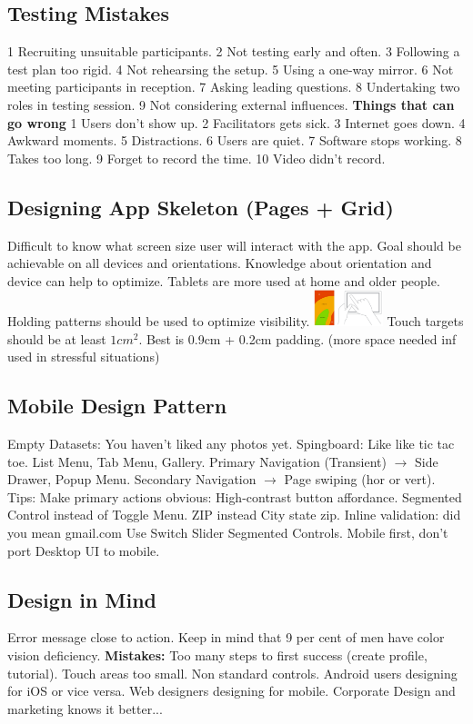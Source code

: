 \subsection{Testing Mistakes}
1 Recruiting unsuitable participants. 2 Not testing early and often. 3 Following a test plan too rigid. 4 Not rehearsing the setup. 5 Using a one-way mirror. 6 Not meeting participants in reception. 7 Asking leading questions. 8 Undertaking two roles in testing session. 9 Not considering external influences.
\textbf{Things that can go wrong}
1 Users don't show up. 2 Facilitators gets sick. 3 Internet goes down. 4 Awkward moments. 5 Distractions. 6 Users are quiet. 7 Software stops working. 8 Takes too long. 9 Forget to record the time. 10 Video didn't record.

\subsection{Designing App Skeleton (Pages + Grid)}
Difficult to know what screen size user will interact with the app. Goal should be achievable on all devices and orientations. Knowledge about orientation and device can help to optimize. Tablets are more used at home and older people. Holding patterns should be used to optimize visibility.
\includegraphics[width=0.15\textwidth]{holding.png}
Touch targets should be at least $1cm^2$. Best is 0.9cm + 0.2cm padding. (more space needed inf used in stressful situations)

\subsection{Mobile Design Pattern}
Empty Datasets: You haven't liked any photos yet.
Spingboard: Like like tic tac toe.
List Menu, Tab Menu, Gallery.
Primary Navigation (Transient) $\rightarrow$ Side Drawer, Popup Menu.
Secondary Navigation $\rightarrow$ Page swiping (hor or vert).
Tips:
Make primary actions obvious: High-contrast button affordance.
Segmented Control instead of Toggle Menu.
ZIP instead City state zip.
Inline validation: did you mean gmail.com
Use Switch Slider Segmented Controls.
Mobile first, don't port Desktop UI to mobile.

\subsection{Design in Mind}
Error message close to action. Keep in mind that 9 per cent of men have color vision deficiency.
\textbf{Mistakes:} Too many steps to first success (create profile, tutorial). Touch areas too small. Non standard controls. Android users designing for iOS or vice versa. Web designers designing for mobile. Corporate Design and marketing knows it better...

